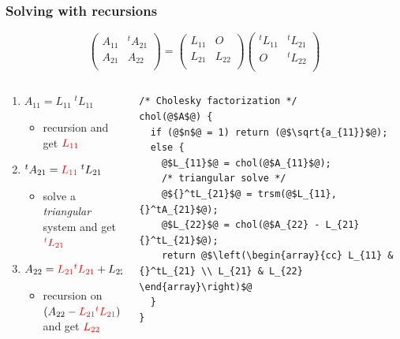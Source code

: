 \documentclass[12pt,dvipdfmx]{beamer}
\newcommand{\aka}[1]{{\color{red}#1}}
\begin{document}
\begin{frame}[fragile]
\frametitle{Solving with recursions}

\[
\left(
\begin{array}{cc}
A_{11} & {}^tA_{21} \\
A_{21} & A_{22} \\
\end{array}
\right)
=
\left(
\begin{array}{cc}
L_{11}     & O     \\
L_{21} & L_{22} \\
\end{array}
\right)
\left(
\begin{array}{cc}
{}^tL_{11} & {}^tL_{21} \\
O         & {}^tL_{22} \\
\end{array}
\right)
\]


\begin{columns}[t]
\begin{column}{0.53\textwidth}
\begin{enumerate}
\item $A_{11} = L_{11} \; {}^tL_{11}$ \\
  \begin{itemize}
  \item<2-> recursion and get $\aka{L_{11}}$
  \end{itemize}
\item ${}^tA_{21} = \aka{L_{11}}  \; {}^tL_{21}$ \\
  \begin{itemize}
  \item<3-> solve a {\em triangular} system and get $\aka{{}^tL_{21}}$
  \end{itemize}
\item$A_{22} = \aka{L_{21}{}^tL_{21}} + L_{22} \; {}^tL_{22}$ \\
  \begin{itemize}
  \item<4->
    recursion on $(A_{22} - \aka{L_{21}{}^tL_{21}})$ and get $\aka{L_{22}}$
  \end{itemize}
\end{enumerate}
\end{column}

\begin{column}{0.45\textwidth}
\begin{lstlisting}[basicstyle=\scriptsize]
/* Cholesky factorization */
chol(@$A$@) {
  if (@$n$@ = 1) return (@$\sqrt{a_{11}}$@);
  else {
    @$L_{11}$@ = chol(@$A_{11}$@);
    /* triangular solve */
    @${}^tL_{21}$@ = trsm(@$L_{11}, {}^tA_{21}$@);
    @$L_{22}$@ = chol(@$A_{22} - L_{21}{}^tL_{21}$@);
    return @$\left(\begin{array}{cc} L_{11} & {}^tL_{21} \\ L_{21} & L_{22} \end{array}\right)$@
  }
}
\end{lstlisting}
\end{column}
\end{columns}
\end{frame}
\end{document}
